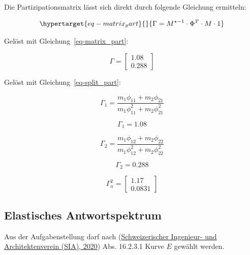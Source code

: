 \documentclass[
  letterpaper,
  DIV=11]{scrreprt}
\begin{document}
Die Partizipationsmatrix lässt sich direkt durch folgende Gleichung
ermitteln:

\begin{equation}\protect\hypertarget{eq-matrix_part}{}{
\Gamma = M^{\star-1} \cdot \Phi^T \cdot M \cdot 1
}\label{eq-matrix_part}\end{equation}

Gelöst mit Gleichung~\ref{eq-matrix_part}:

\begin{equation}\Gamma = \left[\begin{matrix}1.08\\0.288\end{matrix}\right]\end{equation}

Gelöst mit Gleichung~\ref{eq-split_part}:

\begin{equation}\Gamma_{1} = \frac{m_{1} \phi_{11} + m_{2} \phi_{21}}{m_{1} \phi_{11}^{2} + m_{2} \phi_{21}^{2}}\end{equation}

\begin{equation}\Gamma_{1} = 1.08\end{equation}

\begin{equation}\Gamma_{2} = \frac{m_{1} \phi_{12} + m_{2} \phi_{22}}{m_{1} \phi_{12}^{2} + m_{2} \phi_{22}^{2}}\end{equation}

\begin{equation}\Gamma_{2} = 0.288\end{equation}

\begin{equation}\Gamma^{2}_{n} = \left[\begin{matrix}1.17\\0.0831\end{matrix}\right]\end{equation}

\hypertarget{elastisches-antwortspektrum-4}{%
\subsection{Elastisches
Antwortspektrum}\label{elastisches-antwortspektrum-4}}

Aus der Aufgabenstellung darf nach
(\protect\hyperlink{ref-SIA261_2020}{Schweizerischer Ingenieur- und
Architektenverein (SIA), 2020}) Abs. 16.2.3.1 Kurve \(E\) gewählt
werden.
\end{document}
